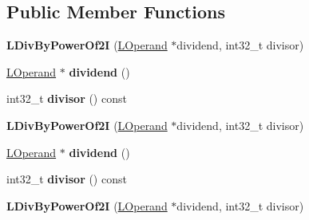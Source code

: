 \subsection*{Public Member Functions}
\begin{DoxyCompactItemize}
\item 
{\bfseries L\+Div\+By\+Power\+Of2I} (\hyperlink{classv8_1_1internal_1_1_l_operand}{L\+Operand} $\ast$dividend, int32\+\_\+t divisor)\hypertarget{classv8_1_1internal_1_1_l_div_by_power_of2_i_aab2d9532de12649fb56d5fb221e67eaf}{}\label{classv8_1_1internal_1_1_l_div_by_power_of2_i_aab2d9532de12649fb56d5fb221e67eaf}

\item 
\hyperlink{classv8_1_1internal_1_1_l_operand}{L\+Operand} $\ast$ {\bfseries dividend} ()\hypertarget{classv8_1_1internal_1_1_l_div_by_power_of2_i_a13e848c75a58a333aa73e7a63d3135b0}{}\label{classv8_1_1internal_1_1_l_div_by_power_of2_i_a13e848c75a58a333aa73e7a63d3135b0}

\item 
int32\+\_\+t {\bfseries divisor} () const \hypertarget{classv8_1_1internal_1_1_l_div_by_power_of2_i_a1ecfe968b5695fb6ce2e409408bad665}{}\label{classv8_1_1internal_1_1_l_div_by_power_of2_i_a1ecfe968b5695fb6ce2e409408bad665}

\item 
{\bfseries L\+Div\+By\+Power\+Of2I} (\hyperlink{classv8_1_1internal_1_1_l_operand}{L\+Operand} $\ast$dividend, int32\+\_\+t divisor)\hypertarget{classv8_1_1internal_1_1_l_div_by_power_of2_i_aab2d9532de12649fb56d5fb221e67eaf}{}\label{classv8_1_1internal_1_1_l_div_by_power_of2_i_aab2d9532de12649fb56d5fb221e67eaf}

\item 
\hyperlink{classv8_1_1internal_1_1_l_operand}{L\+Operand} $\ast$ {\bfseries dividend} ()\hypertarget{classv8_1_1internal_1_1_l_div_by_power_of2_i_a13e848c75a58a333aa73e7a63d3135b0}{}\label{classv8_1_1internal_1_1_l_div_by_power_of2_i_a13e848c75a58a333aa73e7a63d3135b0}

\item 
int32\+\_\+t {\bfseries divisor} () const \hypertarget{classv8_1_1internal_1_1_l_div_by_power_of2_i_a1ecfe968b5695fb6ce2e409408bad665}{}\label{classv8_1_1internal_1_1_l_div_by_power_of2_i_a1ecfe968b5695fb6ce2e409408bad665}

\item 
{\bfseries L\+Div\+By\+Power\+Of2I} (\hyperlink{classv8_1_1internal_1_1_l_operand}{L\+Operand} $\ast$dividend, int32\+\_\+t divisor)\hypertarget{classv8_1_1internal_1_1_l_div_by_power_of2_i_aab2d9532de12649fb56d5fb221e67eaf}{}\label{classv8_1_1internal_1_1_l_div_by_power_of2_i_aab2d9532de12649fb56d5fb221e67eaf}


\end{DoxyCompactItemize}
